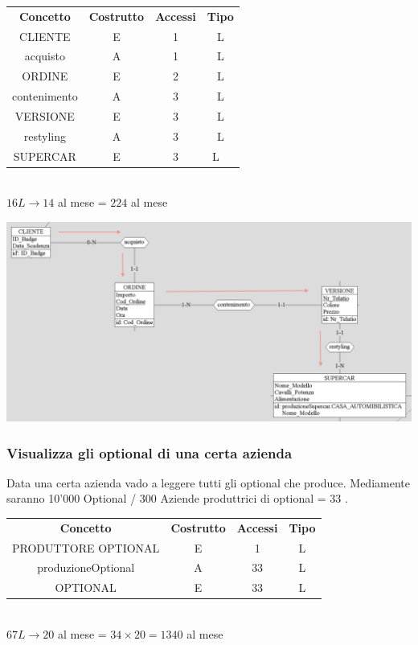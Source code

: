 \documentclass[12pt]{article}
\begin{document}
\begin{table}[H]
    \centering
    \begin{tabular}{ c c c c }
        \rowcolor{red!20!}
        \textbf{Concetto} & \textbf{Costrutto}  & \textbf{Accessi} &
        \textbf{Tipo}\\ 
        CLIENTE & E & 1 & L \\
        acquisto & A & 1 & L \\ 
        ORDINE & E & 2 & L \\ 
        contenimento & A & 3 & L \\
        VERSIONE & E & 3 & L \\ 
        restyling & A & 3 & L \\
        SUPERCAR & E & 3 & L \ \end{tabular}\\
        \( 16L  \rightarrow 14 \) al mese = \( 224 \) al mese
\end{table}

\begin{center}
    \includegraphics[scale=0.53]{images/navigationSchemes/ordiniCliente.png}
\end{center}

\subsubsection{Visualizza gli optional di una certa azienda} 

Data una certa azienda vado a leggere tutti gli optional che produce. Mediamente
saranno 10'000 Optional / 300 Aziende produttrici di optional = 33 .

\begin{table}[H]
    \centering
    \begin{tabular}{ c c c c } 
        \rowcolor{red!20!}
        \textbf{Concetto} & \textbf{Costrutto} & \textbf{Accessi} &
        \textbf{Tipo}\\ 
        PRODUTTORE OPTIONAL & E & 1 & L \\ 
        produzioneOptional & A & 33 & L \\
        OPTIONAL & E & 33 & L \\ 
    \end{tabular}\\
    \( 67L \rightarrow 20\) al mese = \( 34 \times 20 = 1340 \) al mese
\end{table}
\end{document}
